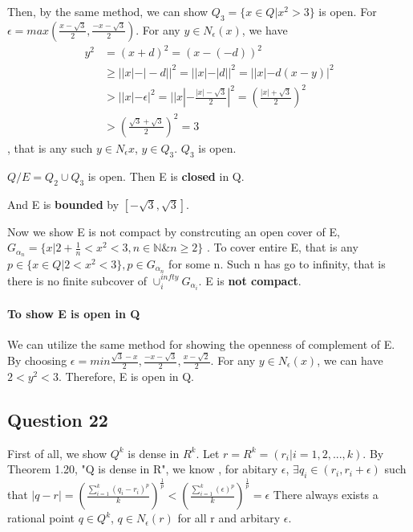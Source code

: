 \documentclass{article}
\begin{document}
Then, by the same method, we can show $Q_{3} = \{ x \in Q | x^2 >3 \}$ is open. For $\epsilon = max( \frac{x-\sqrt{3}}{2}, \frac{-x-\sqrt{3}}{2})$.
For any $ y \in N_{\epsilon}(x)$, we have
\begin{equation}
  \begin{split}
 y^2 &= (x + d)^2 = (x - (-d))^2 \\
 &\geq ||x| - |-d||^2= ||x| - |d||^2 =  ||x| - d(x-y)|^2 \\
 & > | |x| - \epsilon |^2 = | |x| - \frac{|x|-\sqrt{3}}{2}|^2 = (\frac{|x|+\sqrt{3}}{2})^2\\
 & > (\frac{\sqrt{3}+\sqrt{3}}{2})^2 = 3
\end{split}
\end{equation}
, that is any such $ y \in N_{\epsilon}{x}$, $y \in Q_{3}$. $Q_{3}$ is open.

$Q/E = Q_{2} \cup Q_{3}$ is open. Then E is \textbf{closed} in Q.

And E is \textbf{bounded} by $[-\sqrt{3},\sqrt{3}]$.

Now we show E is not compact by constrcuting an open cover of E, $G_{\alpha_n} = \{ x | 2+\frac{1}{n}< x^2< 3,n\in \mathbb{N} \& n \geq 2\}$ .
To cover entire E, that is any $ p \in \{ x \in Q | 2< x^2 < 3 \}, p \in G_{\alpha_n}$ for some n. Such n has go to infinity, that is there is no finite subcover of $\cup_{i}^{infty} G_{\alpha_i}$. E is \textbf{not compact}.

\paragraph{To show E is open in Q}
We can utilize the same method for showing the openness of complement of E. By choosing $\epsilon = min{  \frac{\sqrt{3}-x}{2},\frac{-x-\sqrt{3}}{2}, \frac{x-\sqrt{2}}{2}}$.
For any $ y \in N_{\epsilon}(x) $, we can have $ 2 < y^2 <3 $. Therefore, E is open in Q.

\subsection*{Question 22}

First of all, we show $Q^k$ is dense in $R^k$. Let $r = R^{k} = (r_{i}|i = 1, 2, ... , k)$.
By Theorem 1.20, "Q is dense in R", we know , for abitary $\epsilon$, $ \exists q_{i} \in (r_{i}, r_{i} + \epsilon )$ such that
$ |q - r| = (\frac{ \sum_{i=1}^{k}(q_{i}-r_{i})^p}{k})^{\frac{1}{p}} < (\frac{\sum_{i=1}^{k} (\epsilon)^p}{k})^{\frac{1}{p}} = \epsilon  $
There always exists a rational point $q \in Q^k$, $ q \in N_{\epsilon}(r)$ for all r and arbitary $\epsilon$.
\end{document}
